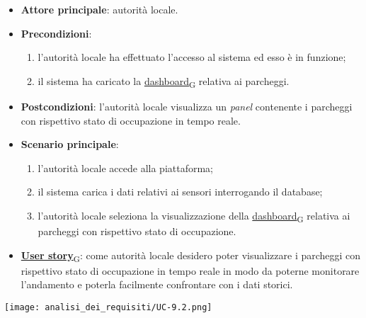\begin{itemize}
	\item \textbf{Attore principale}: autorità locale.
	\item \textbf{Precondizioni}:
	      \begin{enumerate}
		      \item l'autorità locale ha effettuato l'accesso al sistema ed esso è in funzione;
		      \item il sistema ha caricato la \href{https://7last.github.io/docs/rtb/documentazione-interna/glossario\#dashboard}{dashboard\textsubscript{G}} relativa ai parcheggi.
	      \end{enumerate}
	\item \textbf{Postcondizioni}: l'autorità locale visualizza un \textit{panel} contenente i parcheggi con rispettivo stato di occupazione in tempo reale.
	\item \textbf{Scenario principale}:
	      \begin{enumerate}
		      \item l'autorità locale accede alla piattaforma;
		      \item il sistema carica i dati relativi ai sensori interrogando il database;
		      \item l'autorità locale seleziona la visualizzazione della \href{https://7last.github.io/docs/rtb/documentazione-interna/glossario\#dashboard}{dashboard\textsubscript{G}} relativa ai parcheggi con rispettivo stato di occupazione.
	      \end{enumerate}
	\item \href{https://7last.github.io/docs/rtb/documentazione-interna/glossario\#user-story}{\textbf{User story}\textsubscript{G}}:
	      come autorità locale desidero poter visualizzare i parcheggi con rispettivo stato di occupazione in tempo reale in modo da poterne monitorare l'andamento
	      e poterla facilmente confrontare con i dati storici.
\end{itemize}
\begin{center}
	\texttt{[image: analisi\_dei\_requisiti/UC-9.2.png]}
\end{center}
\newpage
